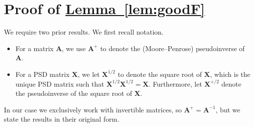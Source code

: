 \documentclass[11pt]{article}
\numberwithin{equation}{section}
\theoremstyle{definition}
\theoremstyle{plain}
\newcommand{\expref}[2]{\hyperref[#2]{#1~\ref{#2}}}
\newcommand{\mX}{\mathbf{X}}
\newcommand{\mA}{\mathbf{A}}
\begin{document}
\section{Proof of \expref{Lemma}{lem:goodF}}\label{sec:goodF}
We require two prior results. We first recall notation.
\begin{itemize}
    \item For a matrix $\mA$, we use $\mA^+$ to denote the (Moore--Penrose) %
    pseudoinverse of $\mA$.  %
    \item For a PSD matrix $\mX$, we let $\mX^{1/2}$ to denote the square root of $\mX$, which is the unique PSD matrix such that $\mX^{1/2}\mX^{1/2}=\mX$. Furthermore, let $\mX^{+/2}$ denote the pseudoinverse  %
    of the square root of $\mX$.
\end{itemize}
In our case we exclusively work with invertible matrices, so $\mA^+=\mA^{-1}$, but we
state the results in their original %
form.  %
  
\end{document}
